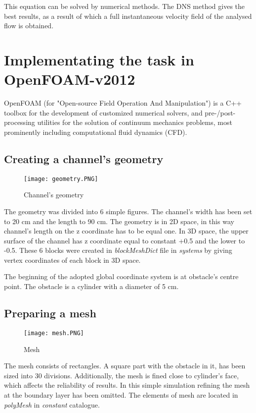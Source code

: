 \documentclass[a4paper,11pt]{article}
\begin{document}
\noindent This equation can be solved by numerical methods. The DNS method gives the best results, as a result of which a full instantaneous velocity field of the analysed flow is obtained.

\section{Implementating the task in OpenFOAM-v2012}

OpenFOAM (for "Open-source Field Operation And Manipulation") is a C++ toolbox for the development of customized numerical solvers, and pre-/post-processing utilities for the solution of continuum mechanics problems, most prominently including computational fluid dynamics (CFD).

\subsection{Creating a channel's geometry}

\begin{figure}[h]
  \centering
  \texttt{[image: geometry.PNG]}
  \caption{Channel's geometry}
\end{figure}\par

The geometry was divided into 6 simple figures. The channel's width has been set to 20 cm and the length to 90 cm. The geometry is in 2D space, in this way channel's length on the z coordinate has to be equal one. In 3D space, the upper surface of the channel has z coordinate equal to constant +0.5 and the lower to -0.5. These 6 blocks were created in  \emph{blockMeshDict} file in \emph{systems} by giving vertex coordinates of each block in 3D space.

The beginning of the adopted global coordinate system is at obstacle's centre point. The obstacle is a cylinder with a diameter of 5 cm.

\subsection{Preparing a mesh}

\begin{figure}[h]
  \centering
  \texttt{[image: mesh.PNG]}
  \caption{Mesh}
\end{figure}

The mesh consists of rectangles. A square part with the obstacle in it, has been sized into 30 divisions. Additionally, the mesh is fined close to cylinder's face, which affects the reliability of results. In this simple simulation refining the mesh at the boundary layer has been omitted. The elements of mesh are located in \emph{polyMesh} in \emph{constant} catalogue.
\end{document}
